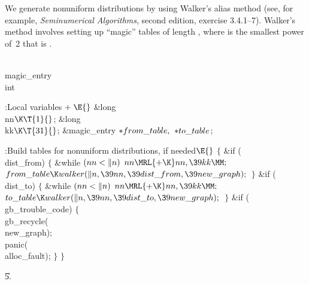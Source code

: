We generate nonuniform distributions by using Walker's alias
method (see, for example, {\sl Seminumerical Algorithms}, second edition,
exercise 3.4.1--7). Walker's method involves setting up ``magic'' tables
of length , where  is the smallest power of~2 that is %
.

\Y\B\F\\{magic\_entry}\5
\\{int}\par
\Y\B\4:Local variables\X${}\mathrel+\E{}$\6
\&{long} \\{nn}${}\K\T{1}{}$;\6
\&{long} \\{kk}${}\K\T{31}{}$;\6
\&{magic\_entry} ${}{*}\\{from\_table},{}$ ${}{*}\\{to\_table}{}$;\par
\fi

\B{}:Build tables for nonuniform distributions, if needed\X${}\E{}$\6
${}\{{}$\1\6
\&{if} (\\{dist\_from})\5
${}\{{}$\1\6
\&{while} ${}(\\{nn}<\|n){}$\1\5
${}\\{nn}\MRL{+{\K}}\\{nn},\39\\{kk}\MM;{}$\2\6
${}\\{from\_table}\K\\{walker}(\|n,\39\\{nn},\39\\{dist\_from},\39\\{new%
\_graph});{}$\6
\4${}\}{}$\2\6
\&{if} (\\{dist\_to})\5
${}\{{}$\1\6
\&{while} ${}(\\{nn}<\|n){}$\1\5
${}\\{nn}\MRL{+{\K}}\\{nn},\39\\{kk}\MM;{}$\2\6
${}\\{to\_table}\K\\{walker}(\|n,\39\\{nn},\39\\{dist\_to},\39\\{new%
\_graph});{}$\6
\4${}\}{}$\2\6
\&{if} (\\{gb\_trouble\_code})\5
${}\{{}$\1\6
\\{gb\_recycle}(\\{new\_graph});\6
\\{panic}(\\{alloc\_fault});\6
\4${}\}{}$\2\6
\4${}\}{}$\2\par
\U5.\fi

